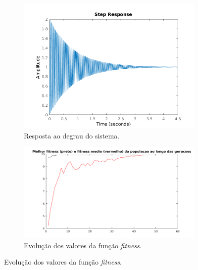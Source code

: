 \begin {enumerate}
    \FloatBarrier
			    
	\begin{figure}[h!]
	
	\centering
	
		\begin{subfigure}{.5\textwidth}
		  \centering
		  \includegraphics[width=1\linewidth]{pid/step_pid_ex_c}
		  \caption{Resposta ao degrau do sistema.}
		  \label{fig:pid_step_c}
		\end{subfigure}%
		\begin{subfigure}{.5\textwidth}
		  \centering
		  \includegraphics[width=1\linewidth]{pid/melhor_fitness_pid_ex_c}
		  \caption{Evolução dos valores da função \textit{fitness}.}
		  \label{fig:pid_fitness_c}
		\end{subfigure}%
		

\end{figure}
\end{enumerate}
